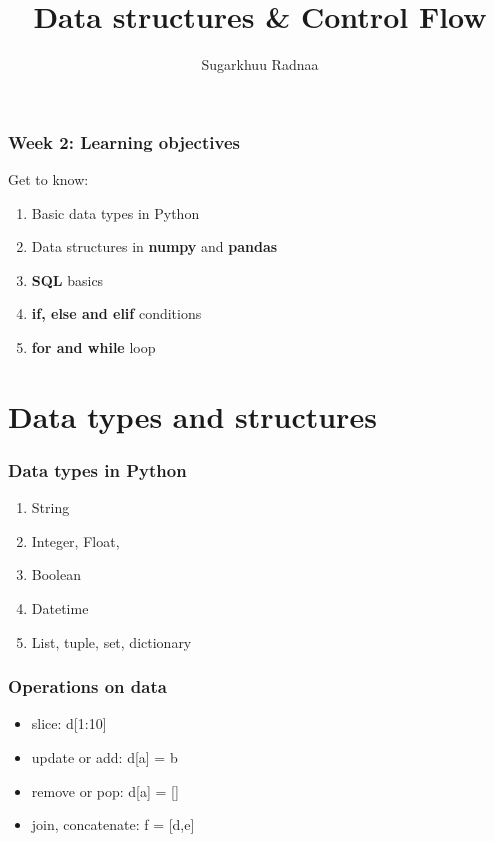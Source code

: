 \documentclass{beamer}
\title[Introduction to Python]{Data structures \& Control Flow}
\author{Sugarkhuu Radnaa}
\institute[]
{
Py4Econ in Ulaanbaatar \\ 
\medskip
\textit{py4econ@gmail.com} 
}
\date{}  %
\begin{document}
\begin{frame}
\titlepage %
\end{frame}

\begin{frame}
    \frametitle{Week 2: Learning objectives}
    Get to know: 
    \begin{enumerate}
        \item Basic data types in Python
        \item Data structures in \textbf{numpy} and \textbf{pandas}
        \item \textbf{SQL} basics
        \item \textbf{if, else and elif} conditions
        \item \textbf{for and while} loop
    \end{enumerate}
\end{frame}

\section{Data types and structures} 

\begin{frame}
\frametitle{Data types in Python}
    \begin{enumerate}
        \item String
        \item Integer, Float, 
        \item Boolean
        \item Datetime
        \item List, tuple, set, dictionary
    \end{enumerate}
\end{frame}

\begin{frame}
    \frametitle{Operations on data}
        \begin{itemize}
            \item slice: d[1:10]
            \item update or add: d[a] = b
            \item remove or pop: d[a] = [] 
            \item join, concatenate: f = [d,e]
        \end{itemize}
\end{frame}
\end{document}
